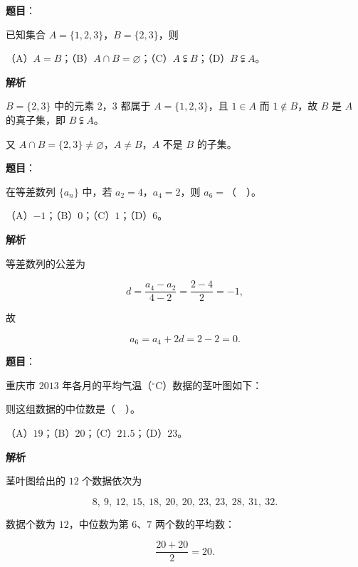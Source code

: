 


\begin{answer}

\textbf{题目}：

已知集合 $A=\{1,2,3\}$，$B=\{2,3\}$，则

（A）$A=B$；（B）$A\cap B=\varnothing$；（C）$A\subsetneqq B$；（D）$B\subsetneqq A$。

\textbf{解析}

$B=\{2,3\}$ 中的元素 $2$，$3$ 都属于 $A=\{1,2,3\}$，且 $1\in A$ 而 $1\notin B$，故 $B$ 是 $A$ 的真子集，即 $B\subsetneqq A$。

又 $A\cap B=\{2,3\}\ne\varnothing$，$A\ne B$，$A$ 不是 $B$ 的子集。


\end{answer}
\begin{answer}

\textbf{题目}：

在等差数列 $\{a_{n}\}$ 中，若 $a_{2}=4$，$a_{4}=2$，则 $a_{6}=$（　）。

（A）$-1$；（B）$0$；（C）$1$；（D）$6$。

\textbf{解析}

等差数列的公差为

\nopagebreak[4]
\[
d=\frac{a_{4}-a_{2}}{4-2}=\frac{2-4}{2}=-1,
\]

故

\nopagebreak[4]
\[
a_{6}=a_{4}+2d=2-2=0.
\]


\end{answer}
\begin{answer}

\textbf{题目}：

重庆市 $2013$ 年各月的平均气温（$^\circ$C）数据的茎叶图如下：
\nopagebreak[4]
\begin{center}\end{center}
\nopagebreak[4]
则这组数据的中位数是（　）。

（A）$19$；（B）$20$；（C）$21.5$；（D）$23$。

\textbf{解析}

茎叶图给出的 $12$ 个数据依次为

\nopagebreak[4]
\[
8,\ 9,\ 12,\ 15,\ 18,\ 20,\ 20,\ 23,\ 23,\ 28,\ 31,\ 32.
\]

数据个数为 $12$，中位数为第 $6$、$7$ 两个数的平均数：

\nopagebreak[4]
\[
\frac{20+20}{2}=20.
\]


\end{answer}
